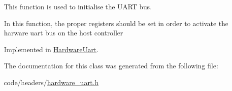 This function is used to initialise the U\+A\+RT bus. 

In this function, the proper registers should be set in order to activate the harware uart bus on the host controller 

Implemented in \hyperlink{classHardwareUart_a2425939b2fc43a8ff119687cf878fa05}{Hardware\+Uart}.



The documentation for this class was generated from the following file\+:\begin{DoxyCompactItemize}
\item 
code/headers/\hyperlink{hardware__uart_8h}{hardware\+\_\+uart.\+h}\end{DoxyCompactItemize}
